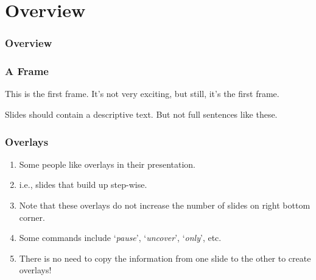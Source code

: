 \documentclass[8pt, hyperref={bookmarks=false},aspectratio=169, xcolor=table]{beamer}
\begin{document}




\hypersetup{
  colorlinks=on,
  linkcolor=black,     %
  urlcolor=black       %
}

\section{Overview}

\begin{frame}\frametitle{Overview}
  \tableofcontents
\end{frame}


\begin{frame}\frametitle{A Frame}
  This is the first frame. It's not very exciting, but still, it's the first frame. 
  
  Slides should contain a descriptive text. But not full sentences like these. 
\end{frame}


\begin{frame}\frametitle{Overlays}
  \begin{enumerate}
    \item<1-> Some people like overlays in their presentation.
    \item<2-> i.e., slides that build up step-wise.
    \item<3-> Note that these overlays do not increase the number of slides on right bottom corner.
    \item<4-> Some commands include `\textit{pause}', `\textit{uncover}', `\textit{only}', etc.
    \item<5-> There is no need to copy the information from one slide to the other to create overlays!
  \end{enumerate}
\end{frame}
\end{document}
